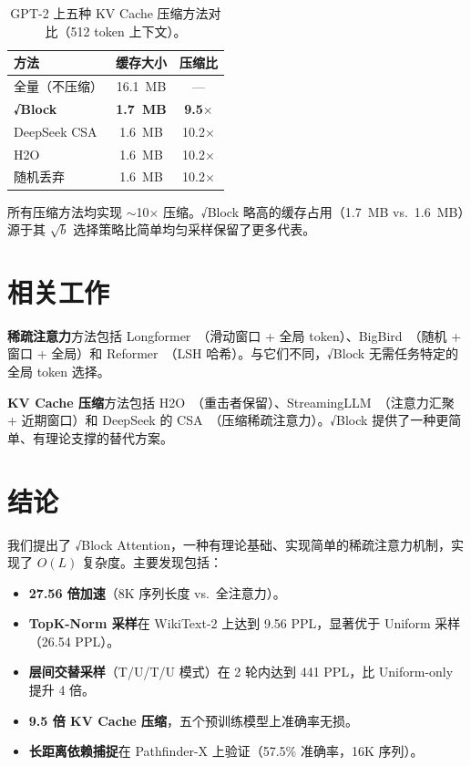 \documentclass[11pt,a4paper,fontset=mac]{ctexart}
\begin{document}
\begin{table}[h]
\centering
\caption{GPT-2 上五种 KV Cache 压缩方法对比（512 token 上下文）。}
\label{tab:kv_methods}
\begin{tabular}{lcc}
\toprule
方法 & 缓存大小 & 压缩比 \\
\midrule
全量（不压缩） & 16.1~MB & --- \\
\textbf{√Block} & \textbf{1.7~MB} & \textbf{9.5$\times$} \\
DeepSeek CSA    & 1.6~MB & 10.2$\times$ \\
H2O             & 1.6~MB & 10.2$\times$ \\
随机丢弃        & 1.6~MB & 10.2$\times$ \\
\bottomrule
\end{tabular}
\end{table}

所有压缩方法均实现 $\sim$10$\times$ 压缩。√Block 略高的缓存占用（1.7~MB vs.\ 1.6~MB）源于其 $\sqrt{b}$ 选择策略比简单均匀采样保留了更多代表。

\section{相关工作}
\label{sec:related}

\textbf{稀疏注意力}方法包括 Longformer~\cite{beltagy2020longformer}（滑动窗口 + 全局 token）、BigBird~\cite{zaheer2020bigbird}（随机 + 窗口 + 全局）和 Reformer~\cite{kitaev2020reformer}（LSH 哈希）。与它们不同，√Block 无需任务特定的全局 token 选择。

\textbf{KV Cache 压缩}方法包括 H2O~\cite{zhang2023h2o}（重击者保留）、StreamingLLM~\cite{xiao2023streaming}（注意力汇聚 + 近期窗口）和 DeepSeek 的 CSA~\cite{deepseek2024}（压缩稀疏注意力）。√Block 提供了一种更简单、有理论支撑的替代方案。

\section{结论}
\label{sec:conclusion}

我们提出了 √Block Attention，一种有理论基础、实现简单的稀疏注意力机制，实现了 $O(L)$ 复杂度。主要发现包括：

\begin{itemize}
    \item \textbf{27.56 倍加速}（8K 序列长度 vs.\ 全注意力）。
    \item \textbf{TopK-Norm 采样}在 WikiText-2 上达到 9.56 PPL，显著优于 Uniform 采样（26.54 PPL）。
    \item \textbf{层间交替采样}（T/U/T/U 模式）在 2 轮内达到 441 PPL，比 Uniform-only 提升 4 倍。
    \item \textbf{9.5 倍 KV Cache 压缩}，五个预训练模型上准确率无损。
    \item \textbf{长距离依赖捕捉}在 Pathfinder-X 上验证（57.5\% 准确率，16K 序列）。
\end{itemize}
\end{document}
